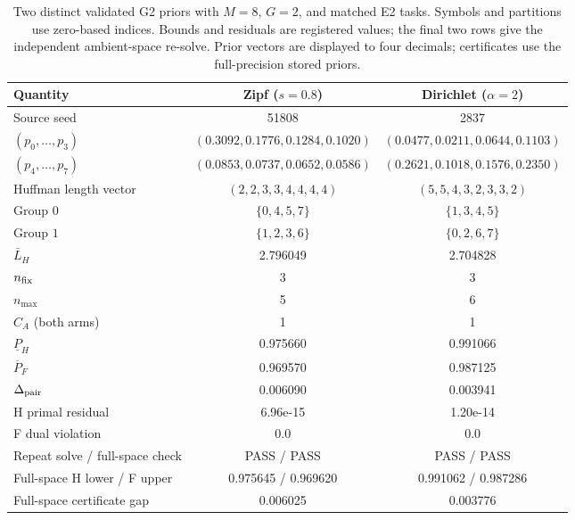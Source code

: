 \begin{table}[tbp]
\caption{Two distinct validated G2 priors with $M=8$, $G=2$, and matched E2 tasks. Symbols and partitions use zero-based indices. Bounds and residuals are registered values; the final two rows give the independent ambient-space re-solve. Prior vectors are displayed to four decimals; certificates use the full-precision stored priors.}
\label{tab:validated}
\centering\small
\begin{tabular}{@{}lcc@{}}
\toprule
\textbf{Quantity} & \textbf{Zipf} ($s=0.8$) & \textbf{Dirichlet} ($\alpha=2$) \\
\midrule
Source seed & 51808 & 2837 \\
$(p_0,\ldots,p_3)$ & $(0.3092,0.1776,0.1284,0.1020)$ & $(0.0477,0.0211,0.0644,0.1103)$ \\
$(p_4,\ldots,p_7)$ & $(0.0853,0.0737,0.0652,0.0586)$ & $(0.2621,0.1018,0.1576,0.2350)$ \\
Huffman length vector & $(2,2,3,3,4,4,4,4)$ & $(5,5,4,3,2,3,3,2)$ \\
Group $0$ & $\{0,4,5,7\}$ & $\{1,3,4,5\}$ \\
Group $1$ & $\{1,2,3,6\}$ & $\{0,2,6,7\}$ \\
$\bar L_H$ & 2.796049 & 2.704828 \\
$n_{\rm fix}$ & 3 & 3 \\
$n_{\max}$ & 5 & 6 \\
$C_A$ (both arms) & 1 & 1 \\
$\underline P_H$ & 0.975660 & 0.991066 \\
$\overline P_F$ & 0.969570 & 0.987125 \\
$\Delta_{\rm pair}$ & 0.006090 & 0.003941 \\
H primal residual & 6.96e-15 & 1.20e-14 \\
F dual violation & 0.0 & 0.0 \\
Repeat solve / full-space check & PASS / PASS & PASS / PASS \\
Full-space H lower / F upper & 0.975645 / 0.969620 & 0.991062 / 0.987286 \\
Full-space certificate gap & 0.006025 & 0.003776 \\
\bottomrule
\end{tabular}
\end{table}
